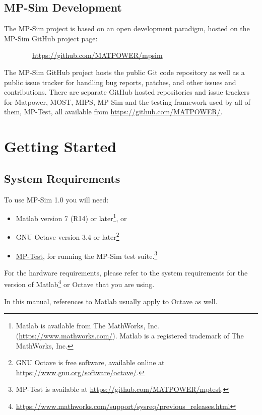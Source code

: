 \documentclass[12pt]{article}
\newcommand{\matlab}[0]{{\sc Matlab}}
\newcommand{\matpower}[0]{{\sc Matpower}}
\newcommand{\mptest}[0]{{MP-Test}}
\newcommand{\mptesturl}[0]{https://github.com/MATPOWER/mptest}
\newcommand{\mptestlink}[0]{\href{\mptesturl}{\mptest{}}}
\newcommand{\mips}[0]{{MIPS}}
\newcommand{\mpsim}[0]{{MP-Sim}}
\newcommand{\mpsimver}[0]{1.0}
\newcommand{\mpsimurl}[0]{https://github.com/MATPOWER/mpsim}
\newcommand{\most}[0]{{MOST}}
\numberwithin{equation}{section}
\numberwithin{table}{section}
\numberwithin{figure}{section}
\begin{document}
\subsection{\mpsim{} Development}
\label{sec:development}

The \mpsim{} project is based on an open development paradigm, hosted on the \mpsim{} GitHub project page:

\bigskip

~~~~~~~~\url{\mpsimurl}

\bigskip

The \mpsim{} GitHub project hosts the public Git code repository as well as a public issue tracker for handling bug reports, patches, and other issues and contributions. There are separate GitHub hosted repositories and issue trackers for \matpower{}, \most{}, \mips{}, \mpsim{} and the testing framework used by all of them, \mptest{}, all available from \url{https://github.com/MATPOWER/}.


\section{Getting Started}

\subsection{System Requirements}
\label{sec:sysreq}
To use \mpsim{} \mpsimver{} you will need:
\begin{itemize}
\item \matlab{}\textsuperscript{\tiny \textregistered} version 7 (R14) or later\footnote{\matlab{} is available from The MathWorks, Inc. (\url{https://www.mathworks.com/}). \matlab{} is a registered trademark of The MathWorks, Inc.}, or
\item GNU Octave version 3.4 or later\footnote{GNU Octave \cite{octave} is free software, available online at \url{https://www.gnu.org/software/octave/}.}
\item \mptestlink{}, for running the \mpsim{} test suite.\footnote{\mptest{} is available at \url{\mptesturl}.}
\end{itemize}

For the hardware requirements, please refer to the system requirements for the version of \matlab{}\footnote{\url{https://www.mathworks.com/support/sysreq/previous_releases.html}} or Octave that you are using.

In this manual, references to \matlab{} usually apply to Octave as well.
\end{document}
